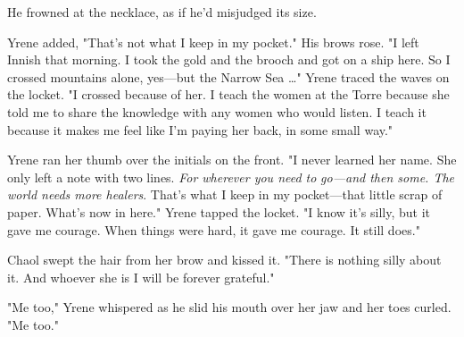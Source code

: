 He frowned at the necklace, as if he'd misjudged its size.

Yrene added, "That's not what I keep in my pocket." His brows rose. "I left Innish that morning. I took the gold and the brooch and got on a ship here. So I crossed mountains alone, yes---but the Narrow Sea
\ldots" Yrene traced the waves on the locket. "I crossed because of her. I teach the women at the Torre because she told me to share the knowledge with any women who would listen. I teach it because it makes me feel like I'm paying her back, in some small way."

Yrene ran her thumb over the initials on the front. "I never learned her name. She only left a note with two lines. \emph{For wherever you need to} \emph{go---and then some. The world needs more healers}. That's what I keep in my pocket---that little scrap of paper. What's now in here." Yrene tapped the locket. "I know it's silly, but it gave me courage. When things were hard, it gave me courage. It still does."

Chaol swept the hair from her brow and kissed it. "There is nothing silly about it. And whoever she is  I will be forever grateful."

"Me too," Yrene whispered as he slid his mouth over her jaw and her toes curled. "Me too."


